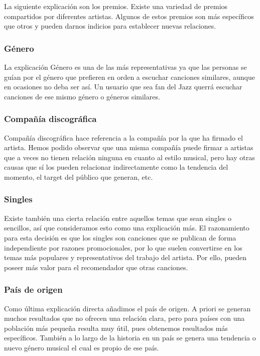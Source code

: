 La siguiente explicación son los premios. Existe una variedad de premios compartidos por diferentes artistas. Algunos de estos premios son más específicos que otros y pueden darnos indicios para establecer nuevas relaciones.

\subsubsection*{Género}

La explicación Género es una de las más representativas ya que las personas se guían por el género que prefieren en orden a escuchar canciones similares, aunque en ocasiones no deba ser así. Un usuario que sea fan del Jazz querrá escuchar canciones de ese mismo género o géneros similares.

\subsubsection*{Compañía discográfica}

Compañía discográfica hace referencia a la compañía por la que ha firmado el artista. Hemos podido observar que una misma compañía puede firmar a artistas que a veces no tienen relación ninguna en cuanto al estilo musical, pero hay otras causas que sí los pueden relacionar indirectamente como la tendencia del momento, el target del público que generan, etc.

\subsubsection*{Singles}

Existe también una cierta relación entre aquellos temas que sean singles o sencillos, así que consideramos esto como una explicación más. El razonamiento para esta decisión es que los singles son canciones que se publican de forma independiente por razones promocionales, por lo que suelen convertirse en los temas más populares y representativos del trabajo del artista. Por ello, pueden poseer más valor para el recomendador que otras canciones.

\subsubsection*{País de origen}

Como última explicación directa añadimos el país de origen. A priori se generan muchos resultados que no ofrecen una relación clara, pero para países con una población más pequeña resulta muy útil, pues obtenemos resultados más específicos. También a lo largo de la historia en un país se genera una tendencia o nuevo género musical el cual es propio de ese país.

